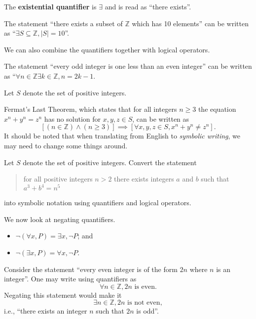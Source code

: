 \begin{definition}
    The \textbf{existential quantifier} is $\exists$ and is  read as ``there exists''.
\end{definition}
\begin{example}
    The statement ``there exists a subset of $\mathbb{Z}$ which has 10 elements'' can be written as ``$\exists S \subseteq \mathbb{Z}, |S| = 10$''.
\end{example}

We can also combine the quantifiers together with logical operators.
\begin{example}
    The statement ``every odd integer is one less than an even integer'' can be written as ``$\forall n \in \mathbb{Z} \exists k \in \mathbb{Z}, n = 2k - 1$.
\end{example}
\begin{example}
    Let $S$ denote the set of positive integers.
    
    Fermat's Last Theorem, which states that for all integers $n\geq 3$ the equation $x^n + y^n = z^n$ has no solution for $x, y, z \in S$, can be written as
    \[
        \left[(n \in \mathbb{Z}) \land (n \geq 3)\right] \implies \left[\forall x, y, z \in S, x^n + y^n \neq z^n\right].
    \]
    It should be noted that when translating from English to \textit{symbolic writing}, we may need to change some things around.
\end{example}

\begin{exercise}
    Let $S$ denote the set of positive integers. Convert the statement
    \begin{quote}
        for all positive integers $n > 2$ there exists integers $a$ and $b$ such that $a^3 + b^4 = n^5$
    \end{quote}
    into symbolic notation using quantifiers and logical operators.
\end{exercise}

We now look at negating quantifiers.
\begin{itemize}
    \item $\lnot(\forall x, P) = \exists x, \lnot P$; and
    \item $\lnot(\exists x, P) = \forall x, \lnot P$.
\end{itemize}
\begin{example}
    Consider the statement ``every even integer is of the form $2n$ where $n$ is an integer''. One may write using quantifiers as
    \[
        \forall n \in\mathbb{Z}, 2n \text{ is even}.
    \]
    Negating this statement would make it
    \[
        \exists n \in \mathbb{Z}, 2n \text{ is not even},
    \]
    i.e., ``there exists an integer $n$ such that $2n$ is odd''.
\end{example}

